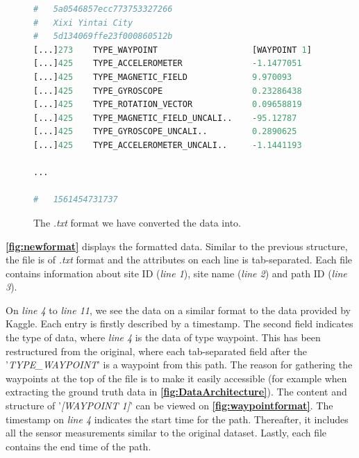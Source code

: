 \begin{figure}[H]
\lstset{numbers=left}
\begin{lstlisting}[language=Python]
#	5a0546857ecc773753327266
#	Xixi Yintai City
#	5d134069ffe23f000860512b
[...]273    TYPE_WAYPOINT                   [WAYPOINT 1]	  [WAYPOINT 2]      ...
[...]425    TYPE_ACCELEROMETER	            -1.1477051      1.6084747	        ...
[...]425    TYPE_MAGNETIC_FIELD	            9.970093        31.666565	        ...
[...]425    TYPE_GYROSCOPE	                0.23286438      -0.18293762	      ...
[...]425    TYPE_ROTATION_VECTOR            0.09658819	    0.061834227       ...
[...]425    TYPE_MAGNETIC_FIELD_UNCALI..    -95.12787	      -39.694214        ...
[...]425    TYPE_GYROSCOPE_UNCALI..	        0.2890625	      -0.26670837       ...
[...]425    TYPE_ACCELEROMETER_UNCALI..	    -1.1441193	    1.7066345         ...

...

#	1561454731737
\end{lstlisting}
\caption{The \textit{.txt} format we have converted the data into.}
\label{fig:newformat}
\end{figure}

\textbf{\autoref{fig:newformat}} displays the formatted data. Similar to the previous structure, the file is of \textit{.txt} format and the attributes on each line is tab-separated. Each file contains information about site ID (\textit{line 1}), site name (\textit{line 2}) and path ID (\textit{line 3}).


On \textit{line 4} to \textit{line 11}, we see the data on a similar format to the data provided by Kaggle. Each entry is firstly described by a timestamp. The second field indicates the type of data, where \textit{line 4} is the data of type waypoint. This has been restructured from the original, where each tab-separated field after the '\textit{TYPE\_WAYPOINT}' is a waypoint from this path. The reason for gathering the waypoints at the top of the file is to make it easily accessible (for example when extracting the ground truth data in \textbf{\autoref{fig:DataArchitecture}}). The content and structure of '\textit{[WAYPOINT 1]}' can be viewed on \textbf{\autoref{fig:waypointformat}}. The timestamp on \textit{line 4} indicates the start time for the path. Thereafter, it includes all the sensor measurements similar to the original dataset. Lastly, each file contains the end time of the path.

